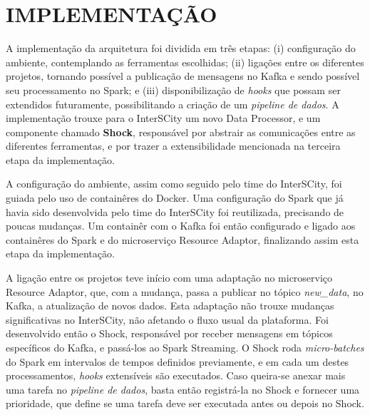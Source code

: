 \section{IMPLEMENTAÇÃO}

A implementação da arquitetura foi dividida em três etapas: (i)
configuração do ambiente, contemplando as ferramentas escolhidas; (ii)
ligações entre os diferentes projetos, tornando possível a publicação de
mensagens no Kafka e sendo possível seu processamento no Spark; e (iii)
disponibilização de \textit{hooks} que possam ser extendidos futuramente,
possibilitando a criação de um \textit{pipeline de dados}. A implementação
trouxe para o InterSCity um novo Data Processor, e um componente chamado
\textbf{Shock}, responsável por abstrair as comunicações entre as diferentes
ferramentas, e por trazer a extensibilidade mencionada na terceira etapa da
implementação.

A configuração do ambiente, assim como seguido pelo time do InterSCity, foi
guiada pelo uso de containêres do Docker. Uma configuração do Spark
que já havia sido desenvolvida pelo time do InterSCity foi reutilizada,
precisando de poucas mudanças. Um containêr com o Kafka foi então configurado e
ligado aos containêres do Spark e do microserviço Resource Adaptor, finalizando
assim esta etapa da implementação.

A ligação entre os projetos teve início com uma adaptação no microserviço
Resource Adaptor, que, com a mudança, passa a publicar no tópico
\textit{new\_data}, no Kafka, a atualização de novos dados. Esta
adaptação não trouxe mudanças significativas no InterSCity, não afetando o
fluxo usual da plataforma. Foi desenvolvido então o Shock, responsável por
receber mensagens em tópicos específicos do Kafka, e passá-los ao Spark
Streaming. O Shock roda \textit{micro-batches} do Spark em intervalos de tempos
definidos previamente, e em cada um destes processamentos, \textit{hooks}
extensíveis são executados. Caso queira-se anexar mais uma tarefa no
\textit{pipeline de dados}, basta então registrá-la no Shock e fornecer uma
prioridade, que define se uma tarefa deve ser executada antes ou depois no
Shock.
